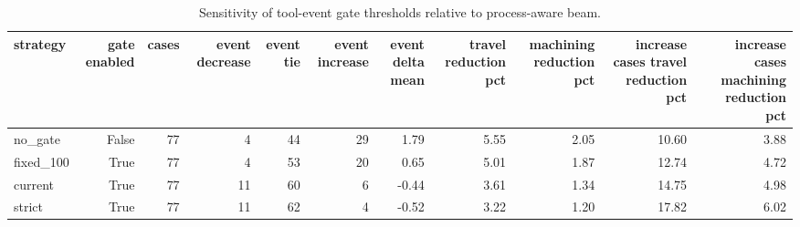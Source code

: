 \begin{table}[t]
\centering
\caption{Sensitivity of tool-event gate thresholds relative to process-aware beam.}
\label{tab:tool-event-gate-sensitivity}
\begin{tabular}{lrrrrrrrrrr}
\toprule
strategy & gate enabled & cases & event decrease & event tie & event increase & event delta mean & travel reduction pct & machining reduction pct & increase cases travel reduction pct & increase cases machining reduction pct \\
\midrule
no\_gate & False & 77 & 4 & 44 & 29 & 1.79 & 5.55 & 2.05 & 10.60 & 3.88 \\
fixed\_100 & True & 77 & 4 & 53 & 20 & 0.65 & 5.01 & 1.87 & 12.74 & 4.72 \\
current & True & 77 & 11 & 60 & 6 & -0.44 & 3.61 & 1.34 & 14.75 & 4.98 \\
strict & True & 77 & 11 & 62 & 4 & -0.52 & 3.22 & 1.20 & 17.82 & 6.02 \\
\bottomrule
\end{tabular}
\end{table}
